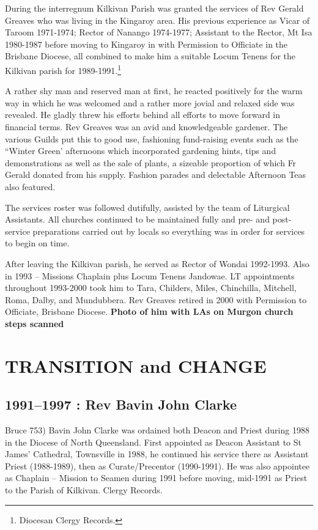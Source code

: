 During the interregnum Kilkivan Parish was granted the services of Rev Gerald Greaves who was living in the Kingaroy area. His previous experience as Vicar of Taroom 1971-1974; Rector of Nanango 1974-1977; Assistant to the Rector, Mt Isa 1980-1987 before moving to Kingaroy in with Permission to Officiate in the Brisbane Diocese, all combined to make him a suitable Locum Tenens for the Kilkivan parish for 1989-1991.\footnote{Diocesan Clergy Records.}

A rather shy man and reserved man at first, he reacted positively for the warm way in which he was welcomed and a rather more jovial and relaxed side was revealed. He gladly threw his efforts behind all efforts to move forward in financial terms. Rev Greaves was an avid and knowledgeable gardener. The various Guilds put this to good use, fashioning fund-raising events such as the ``Winter Green' afternoons which incorporated gardening hints, tips and demonstrations as well as the sale of plants, a sizeable proportion of which Fr Gerald donated from his supply. Fashion parades and delectable Afternoon Teas also featured.

The services roster was followed dutifully, assisted by the team of Liturgical Assistants. All churches continued to be maintained fully and pre- and post-service preparations carried out by locals so everything was in order for services to begin on time.

After leaving the Kilkivan parish, he served as Rector of Wondai 1992-1993. Also in 1993 -- Missions Chaplain plus Locum Tenens Jandowae. LT appointments throughout 1993-2000 took him to Tara, Childers, Miles, Chinchilla, Mitchell, Roma, Dalby, and Mundubbera. Rev Greaves retired in 2000 with Permission to Officiate, Brisbane Diocese. \textbf{Photo of him with LAs on Murgon church steps scanned}

\hypertarget{transition-and-change}{%
\chapter{TRANSITION and CHANGE}\label{transition-and-change}}

\hypertarget{rev-bavin-john-clarke}{%
\section{1991--1997 : Rev Bavin John Clarke}\label{rev-bavin-john-clarke}}

Bruce 753) Bavin John Clarke was ordained both Deacon and Priest during 1988 in the Diocese of North Queensland. First appointed as Deacon Assistant to St James' Cathedral, Townsville in 1988, he continued his service there as Assistant Priest (1988-1989), then as Curate/Precentor (1990-1991). He was also appointee as Chaplain -- Mission to Seamen during 1991 before moving, mid-1991 as Priest to the Parish of Kilkivan. Clergy Records.

